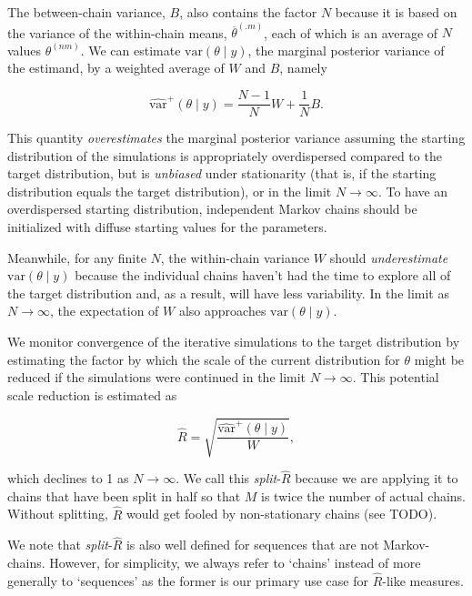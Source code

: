 \documentclass[american,]{article}
\begin{document}
The between-chain variance, \(B\), also contains the factor \(N\)
because it is based on the variance of the within-chain means,
\(\overline{\theta}^{(.m)}\), each of which is an average of \(N\)
values \(\theta^{(nm)}\). We can estimate \(\mbox{var}(\theta \mid y)\),
the marginal posterior variance of the estimand, by a weighted average
of \(W\) and \(B\), namely

\begin{equation}
\widehat{\mbox{var}}^+(\theta \mid y) = \frac{N-1}{N}W + \frac{1}{N}B.
\end{equation}

This quantity \emph{overestimates} the marginal posterior variance
assuming the starting distribution of the simulations is appropriately
overdispersed compared to the target distribution, but is
\emph{unbiased} under stationarity (that is, if the starting
distribution equals the target distribution), or in the limit
\(N\rightarrow\infty\). To have an overdispersed starting distribution,
independent Markov chains should be initialized with diffuse starting
values for the parameters.

Meanwhile, for any finite \(N\), the within-chain variance \(W\) should
\emph{underestimate} \(\mbox{var}(\theta \mid y)\) because the
individual chains haven't had the time to explore all of the target
distribution and, as a result, will have less variability. In the limit
as \(N\rightarrow\infty\), the expectation of \(W\) also approaches
\(\mbox{var}(\theta \mid y)\).

We monitor convergence of the iterative simulations to the target
distribution by estimating the factor by which the scale of the current
distribution for \(\theta\) might be reduced if the simulations were
continued in the limit \(N\rightarrow\infty\). This potential scale
reduction is estimated as

\begin{equation}
\widehat{R} = \sqrt{\frac{\widehat{\mbox{var}}^+(\theta \mid y)}{W}},
\end{equation}

which declines to 1 as \(N\rightarrow\infty\). We call this
\emph{split}-\(\widehat{R}\) because we are applying it to chains that
have been split in half so that \(M\) is twice the number of actual
chains. Without splitting, \(\widehat{R}\) would get fooled by
non-stationary chains (see TODO).

We note that \emph{split}-\(\widehat{R}\) is also well defined for
sequences that are not Markov-chains. However, for simplicity, we always
refer to `chains' instead of more generally to `sequences' as the former
is our primary use case for \(\widehat{R}\)-like measures.
\end{document}

